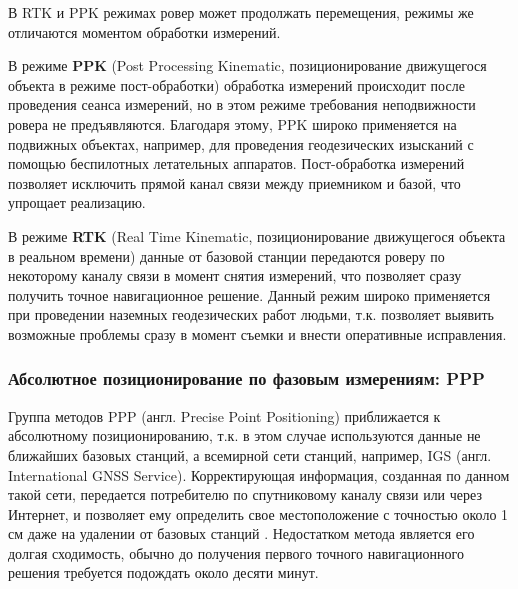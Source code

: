 В RTK и PPK режимах ровер может продолжать перемещения, режимы же отличаются моментом обработки измерений. 


В режиме \textbf{PPK} (Post Processing Kinematic, позиционирование движущегося объекта в режиме пост-обработки) обработка измерений происходит после проведения сеанса измерений, но в этом режиме требования неподвижности ровера не предъявляются. 
Благодаря этому, PPK широко применяется на подвижных объектах, например, для проведения геодезических изысканий с помощью беспилотных летательных аппаратов.
Пост-обработка измерений позволяет исключить прямой канал связи между приемником и базой, что упрощает реализацию. 

В режиме \textbf{RTK} (Real Time Kinematic, позиционирование движущегося объекта в реальном времени) данные от базовой станции передаются роверу по некоторому каналу связи в момент снятия измерений, что позволяет сразу получить точное навигационное решение.
Данный режим широко применяется при проведении наземных геодезических работ людьми, т.к. позволяет выявить возможные проблемы сразу в момент съемки и внести оперативные исправления. 

\subsubsection{Абсолютное позиционирование по фазовым измерениям: PPP}

Группа методов PPP (англ. Precise Point Positioning) приближается к абсолютному позиционированию, т.к. в этом случае используются данные не ближайших базовых станций, а всемирной сети станций, например, IGS (англ. International GNSS Service).
Корректирующая информация, созданная по данном такой сети, передается потребителю по спутниковому каналу связи или через Интернет, и позволяет ему определить свое местоположение с точностью около 1 см даже на удалении от базовых станций \autocite{basile2018}. 
Недостатком метода является его долгая сходимость, обычно до получения первого точного навигационного решения требуется подождать около десяти минут.


{
\renewcommand*{\bibfont}{\small}
\printbibliography[heading=subbibforcha, segment=\therefsegment]
}

